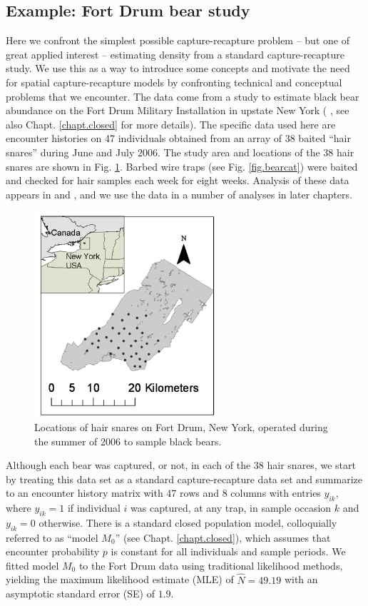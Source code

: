 \subsection{Example: Fort Drum bear study}

Here we confront the simplest possible capture-recapture problem -- but
one of great applied interest --
estimating density from a standard capture-recapture study.
 We use this as a way to introduce some concepts and
motivate the need for spatial capture-recapture models by confronting
technical and conceptual problems that we encounter. The data come
from a study to estimate black bear abundance on the Fort Drum
Military Installation in upstate New York ( \citet{wegan:2008}, see
also Chapt. \ref{chapt.closed} for more details). The specific data
used here are encounter histories on 47 individuals obtained from an
array of 38 baited ``hair snares'' during June and July 2006. The
study area and locations of the 38 hair snares are shown in
Fig. \ref{fig.hairsnares}.  Barbed wire traps (see
Fig. \ref{fig.bearcat}) were baited and checked for hair samples each
week for eight weeks.  Analysis of these data appears in
\citet{gardner_etal:2009} and \citet{gardner_etal:2010jwm}, and we use
the data in a number of analyses in later chapters.

\begin{figure}[ht]
\begin{center}
\includegraphics[height=3in]{Ch1/figs/hairsnares}
\end{center}
\caption{Locations of hair snares on Fort Drum, New York, operated
  during the summer of 2006 to sample black bears.}
\label{fig.hairsnares}
\end{figure}

Although each bear was captured, or not, in each of the 38 hair
snares, we start by treating this data set as a standard capture-recapture data
set and summarize to an encounter history matrix with 47 rows and 8
columns with entries $y_{ik}$, where $y_{ik}=1$ if individual $i$ was
captured, at any trap, in sample occasion $k$ and $y_{ik}=0$
otherwise. There is a standard closed population model, colloquially
referred to as ``model $M_0$'' (see Chapt. \ref{chapt.closed}), which
assumes that encounter probability $p$ is constant for all individuals
and sample periods.  We fitted model $M_0$ to the Fort Drum data using
traditional likelihood methods, yielding the maximum likelihood
estimate (MLE) of $\hat{N} = 49.19$ with an asymptotic standard error
(SE) of $1.9$.

